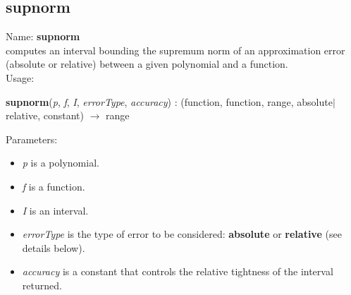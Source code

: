 \subsection{supnorm}
\label{labsupnorm}
\noindent Name: \textbf{supnorm}\\
computes an interval bounding the supremum norm of an approximation error (absolute or relative) between a given polynomial and a function.\\
\noindent Usage: 
\begin{center}
\textbf{supnorm}(\emph{p}, \emph{f}, \emph{I}, \emph{errorType}, \emph{accuracy}) : (\textsf{function}, \textsf{function}, \textsf{range}, \textsf{absolute$|$relative}, \textsf{constant}) $\rightarrow$ \textsf{range}\\
\end{center}
Parameters: 
\begin{itemize}
\item \emph{p} is a polynomial.
\item \emph{f} is a function.
\item \emph{I} is an interval.
\item \emph{errorType} is the type of error to be considered: \textbf{absolute} or \textbf{relative} (see details below).
\item \emph{accuracy} is a constant that controls the relative tightness of the interval returned. 
\end{itemize}
